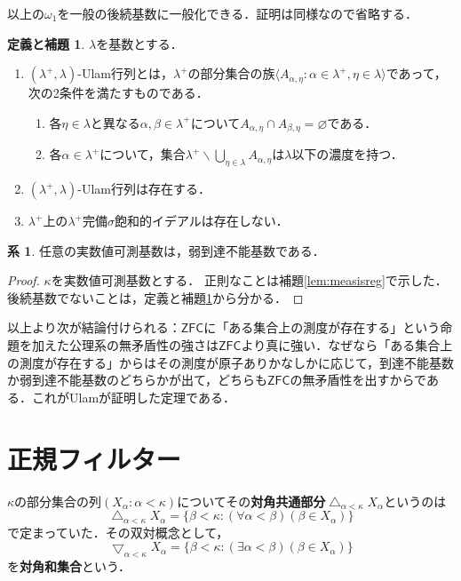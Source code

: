 \documentclass[uplatex]{jsarticle}
\newcommand{\ZFC}{\mathsf{ZFC}}
\DeclareMathOperator*{\diagintr}{\triangle}
\DeclareMathOperator*{\diaguni}{\bigtriangledown}
\newcommand{\seq}[1]{{\langle#1\rangle}}
\renewcommand\emptyset{\varnothing}
\renewcommand{\setminus}{\smallsetminus}
\theoremstyle{definition}
\newtheorem{cor}[thm]{系}
\newtheorem{defiandlem}[thm]{定義と補題}
\begin{document}
	以上の$\omega_1$を一般の後続基数に一般化できる．証明は同様なので省略する．
	
	\begin{defiandlem}\label{dl:lambdaplusulam}
		$\lambda$を基数とする．
		\begin{enumerate}
			\item $(\lambda^+, \lambda)$-Ulam行列とは，$\lambda^+$の部分集合の族$\seq{ A_{\alpha, \eta} : \alpha \in \lambda^+, \eta \in \lambda }$であって，次の2条件を満たすものである．
			\begin{enumerate}
				\item 各$\eta \in \lambda$と異なる$\alpha, \beta \in \lambda^+$について$A_{\alpha,\eta} \cap A_{\beta,\eta} = \emptyset$である．
				\item 各$\alpha \in \lambda^+$について，集合$\lambda^+ \setminus \bigcup_{\eta \in \lambda} A_{\alpha,\eta}$は$\lambda$以下の濃度を持つ．
			\end{enumerate}
			\item $(\lambda^+, \lambda)$-Ulam行列は存在する．
			\item $\lambda^+$上の$\lambda^+$完備$\sigma$飽和的イデアルは存在しない．
		\end{enumerate}
	\end{defiandlem}
	
	\begin{cor}
		任意の実数値可測基数は，弱到達不能基数である．
	\end{cor}
	\begin{proof}
		$\kappa$を実数値可測基数とする．
		正則なことは補題\ref{lem:measisreg}で示した．
		後続基数でないことは，定義と補題\ref{dl:lambdaplusulam}から分かる．
	\end{proof}
	
	以上より次が結論付けられる：$\ZFC$に「ある集合上の測度が存在する」という命題を加えた公理系の無矛盾性の強さは$\ZFC$より真に強い．なぜなら「ある集合上の測度が存在する」からはその測度が原子ありかなしかに応じて，到達不能基数か弱到達不能基数のどちらかが出て，どちらも$\ZFC$の無矛盾性を出すからである．これがUlamが証明した定理である．
		
	\section{正規フィルター}
	
	$\kappa$の部分集合の列$(X_\alpha : \alpha < \kappa)$についてその\textbf{対角共通部分}$\diagintr_{\alpha < \kappa} X_\alpha$というのは
	\[
	\diagintr_{\alpha < \kappa} X_\alpha = \{ \beta < \kappa : (\forall \alpha < \beta)(\beta \in X_\alpha) \}
	\]
	で定まっていた．その双対概念として，
	\[
	\diaguni_{\alpha < \kappa} X_\alpha = \{ \beta < \kappa : (\exists \alpha < \beta)(\beta \in X_\alpha) \}
	\]
	を\textbf{対角和集合}という．
	
\end{document}
